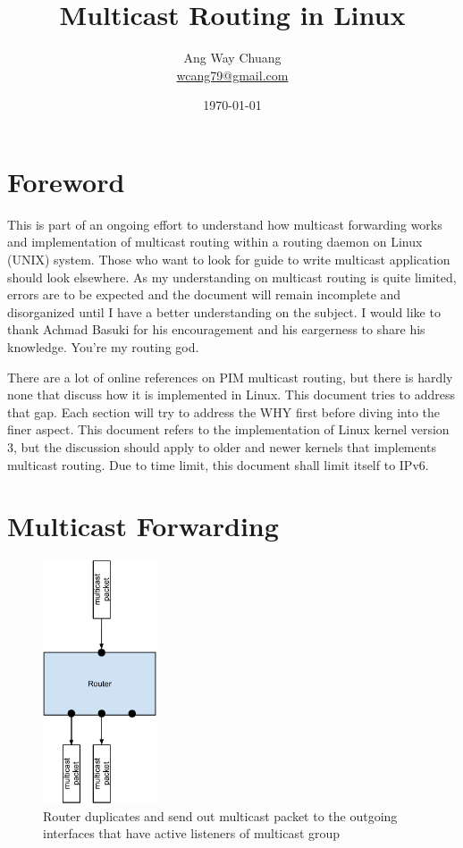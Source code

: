 \documentclass{article}
\begin{document}
\title{Multicast Routing in Linux}
\author{Ang Way Chuang \\
\small{\href{mailto:wcang79@gmail.com}{wcang79@gmail.com}}}
\date{\today}
\maketitle
\section{Foreword}
This is part of an ongoing effort to understand how multicast forwarding works
and implementation of multicast routing within a routing daemon on Linux (UNIX)
system. Those who want to look for guide to write multicast application should
look elsewhere. As my understanding on multicast routing is quite limited,
errors are to be expected and the document will remain incomplete and
disorganized until I have a better understanding on the subject. I would like to
thank Achmad Basuki for his encouragement and his eargerness to share his
knowledge. You're my routing god.

There are a lot of online references on PIM multicast routing, but there is
hardly none that discuss how it is implemented in Linux. This document tries to
address that gap. Each section will try to address the WHY first before diving
into the finer aspect. This document refers to the implementation of Linux
kernel version 3, but the discussion should apply to older and newer kernels
that implements multicast routing. Due to time limit, this document shall limit
itself to IPv6.

\section{Multicast Forwarding}
\begin{figure}[!h]
  \begin{center}
    \includegraphics[width=0.3\textwidth]{mcast-forward}
    \caption{Router duplicates and send out multicast packet to the
    outgoing interfaces that have active listeners of multicast group}
    \label{fig:mcast-forward}
  \end{center}
\end{figure}
\end{document}
